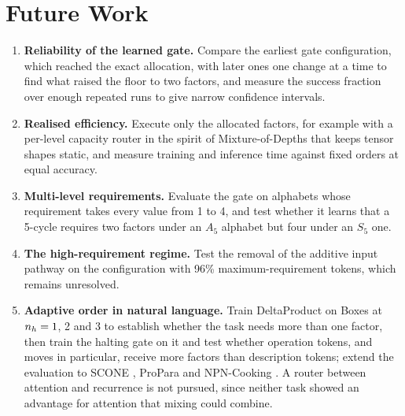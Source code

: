 \section{Future Work}
\label{sec:future}
\begin{enumerate}[label={(\arabic*)}]
	\item \textbf{Reliability of the learned gate.} Compare the earliest gate configuration, which reached the exact allocation, with later ones one change at a time to find what raised the floor to two factors, and measure the success fraction over enough repeated runs to give narrow confidence intervals.
	\item \textbf{Realised efficiency.} Execute only the allocated factors, for example with a per-level capacity router in the spirit of Mixture-of-Depths \cite{mod} that keeps tensor shapes static, and measure training and inference time against fixed orders at equal accuracy.
	\item \textbf{Multi-level requirements.} Evaluate the gate on alphabets whose requirement takes every value from 1 to 4, and test whether it learns that a 5-cycle requires two factors under an $A_5$ alphabet but four under an $S_5$ one.
	\item \textbf{The high-requirement regime.} Test the removal of the additive input pathway \cite{howe} on the configuration with 96\% maximum-requirement tokens, which remains unresolved.
	\item \textbf{Adaptive order in natural language.} Train DeltaProduct on Boxes at $n_h = 1$, 2 and 3 to establish whether the task needs more than one factor, then train the halting gate on it and test whether operation tokens, and moves in particular, receive more factors than description tokens; extend the evaluation to SCONE \cite{scone}, ProPara \cite{propara} and NPN-Cooking \cite{npncooking}. A router between attention and recurrence is not pursued, since neither task showed an advantage for attention that mixing could combine.
\end{enumerate}
